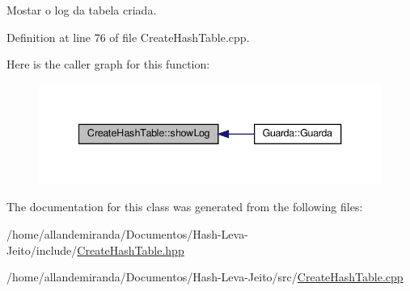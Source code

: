 Mostar o log da tabela criada. 



Definition at line 76 of file Create\+Hash\+Table.\+cpp.

Here is the caller graph for this function\+:
\nopagebreak
\begin{figure}[H]
\begin{center}
\leavevmode
\includegraphics[width=340pt]{d9/d9e/class_create_hash_table_ab50343628947f7064f4ab646a834ef03_icgraph}
\end{center}
\end{figure}


The documentation for this class was generated from the following files\+:\begin{DoxyCompactItemize}
\item 
/home/allandemiranda/\+Documentos/\+Hash-\/\+Leva-\/\+Jeito/include/\hyperlink{_create_hash_table_8hpp}{Create\+Hash\+Table.\+hpp}\item 
/home/allandemiranda/\+Documentos/\+Hash-\/\+Leva-\/\+Jeito/src/\hyperlink{_create_hash_table_8cpp}{Create\+Hash\+Table.\+cpp}\end{DoxyCompactItemize}
